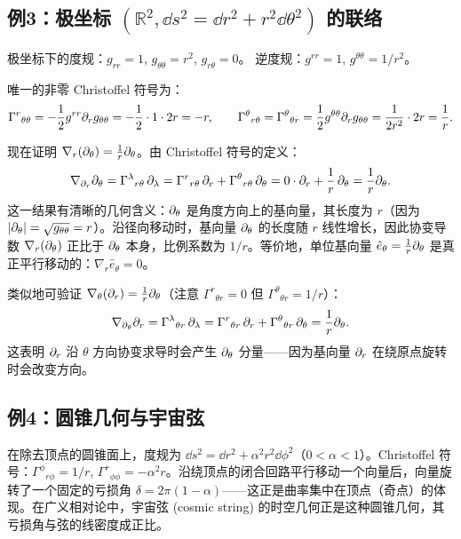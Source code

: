 \subsection{例3：极坐标 $(\mathbb{R}^2, \dd s^2 = \dd r^2 + r^2 \dd\theta^2)$ 的联络}

极坐标下的度规：$g_{rr}=1$, $g_{\theta\theta}=r^2$, $g_{r\theta}=0$。
逆度规：$g^{rr}=1$, $g^{\theta\theta}=1/r^2$。

唯一的非零 Christoffel 符号为：
\begin{equation}
    \Gamma^r{}_{\theta\theta} = -\frac12 g^{rr}\partial_r g_{\theta\theta} = -\frac12 \cdot 1 \cdot 2r = -r, \qquad
    \Gamma^\theta{}_{r\theta} = \Gamma^\theta{}_{\theta r} = \frac12 g^{\theta\theta}\partial_r g_{\theta\theta} = \frac{1}{2r^2}\cdot 2r = \frac{1}{r}.
\end{equation}

现在证明 $\nabla_r(\partial_\theta) = \frac{1}{r}\partial_\theta$。由 Christoffel 符号的定义：
\begin{equation}
    \nabla_{\partial_r}\partial_\theta = \Gamma^\lambda{}_{r\theta}\,\partial_\lambda 
    = \Gamma^r{}_{r\theta}\,\partial_r + \Gamma^\theta{}_{r\theta}\,\partial_\theta 
    = 0 \cdot \partial_r + \frac{1}{r}\,\partial_\theta = \frac{1}{r}\partial_\theta.
\end{equation}
这一结果有清晰的几何含义：$\partial_\theta$ 是角度方向上的基向量，其长度为 $r$（因为 $|\partial_\theta| = \sqrt{g_{\theta\theta}} = r$）。沿径向移动时，基向量 $\partial_\theta$ 的长度随 $r$ 线性增长，因此协变导数 $\nabla_r(\partial_\theta)$ 正比于 $\partial_\theta$ 本身，比例系数为 $1/r$。等价地，单位基向量 $\hat{e}_\theta = \frac{1}{r}\partial_\theta$ 是真正平行移动的：$\nabla_r \hat{e}_\theta = 0$。

类似地可验证 $\nabla_\theta(\partial_r) = \frac{1}{r}\partial_\theta$（注意 $\Gamma^r{}_{\theta r}=0$ 但 $\Gamma^\theta{}_{\theta r} = 1/r$）：
\begin{equation}
    \nabla_{\partial_\theta}\partial_r = \Gamma^\lambda{}_{\theta r}\,\partial_\lambda = \Gamma^r{}_{\theta r}\,\partial_r + \Gamma^\theta{}_{\theta r}\,\partial_\theta = \frac{1}{r}\partial_\theta.
\end{equation}
这表明 $\partial_r$ 沿 $\theta$ 方向协变求导时会产生 $\partial_\theta$ 分量——因为基向量 $\partial_r$ 在绕原点旋转时会改变方向。

\subsection{例4：圆锥几何与宇宙弦}

在除去顶点的圆锥面上，度规为 $\dd s^2 = \dd r^2 + \alpha^2 r^2 \dd\phi^2$（$0<\alpha<1$）。Christoffel 符号：$\Gamma^\phi{}_{r\phi}=1/r$, $\Gamma^r{}_{\phi\phi}=-\alpha^2 r$。沿绕顶点的闭合回路平行移动一个向量后，向量旋转了一个固定的亏损角 $\delta = 2\pi(1-\alpha)$——这正是曲率集中在顶点（奇点）的体现。在广义相对论中，宇宙弦 (cosmic string) 的时空几何正是这种圆锥几何，其亏损角与弦的线密度成正比。

